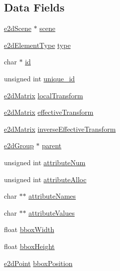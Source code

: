 \subsection*{Data Fields}
\begin{DoxyCompactItemize}
\item 
\hyperlink{structe2d_scene}{e2d\-Scene} $\ast$ \hyperlink{structe2d_element_a0ebd8fae058dd45496c86a2ca317ca9c}{scene}
\item 
\hyperlink{group__e2d_element_ga9bc8cfdec08c7e9069fc707ee456fd38}{e2d\-Element\-Type} \hyperlink{structe2d_element_a7df43d7f6c23b61b843acb56eb3ca19a}{type}
\item 
char $\ast$ \hyperlink{structe2d_element_aecb3b0d045ada529257a2fbf8f829599}{id}
\item 
unsigned int \hyperlink{structe2d_element_a300bb6cf5b184e200523e9bce8346dc4}{unique\-\_\-id}
\item 
\hyperlink{structe2d_matrix}{e2d\-Matrix} \hyperlink{structe2d_element_a52bda732df714953f93c1e6f5f7c7c93}{local\-Transform}
\item 
\hyperlink{structe2d_matrix}{e2d\-Matrix} \hyperlink{structe2d_element_a6c8e26945f09b5157e2111e42f99b879}{effective\-Transform}
\item 
\hyperlink{structe2d_matrix}{e2d\-Matrix} \hyperlink{structe2d_element_a5e6d7341f2dbef1923b0a3fcc13781c6}{inverse\-Effective\-Transform}
\item 
\hyperlink{structe2d_group}{e2d\-Group} $\ast$ \hyperlink{structe2d_element_a3e62eb2fbf1d6bc6d6fe549096a6cee9}{parent}
\item 
unsigned int \hyperlink{structe2d_element_a836181401227a3ca42da026a8d35e730}{attribute\-Num}
\item 
unsigned int \hyperlink{structe2d_element_a70d94929e3789bf7c019c939b0084985}{attribute\-Alloc}
\item 
char $\ast$$\ast$ \hyperlink{structe2d_element_af9b5d9dbbf270b6f92a3ee66ce1b47ac}{attribute\-Names}
\item 
char $\ast$$\ast$ \hyperlink{structe2d_element_ae8591ff93c366b4d66817a70f2d9f33e}{attribute\-Values}
\item 
float \hyperlink{structe2d_element_a6a1d9b223870deeaec7f5e8b23ca4b22}{bbox\-Width}
\item 
float \hyperlink{structe2d_element_a680d0d4219ac8720005c46b55a9676ae}{bbox\-Height}
\item 
\hyperlink{structe2d_point}{e2d\-Point} \hyperlink{structe2d_element_ac2c17ce4cba805b594b314a77923cbf5}{bbox\-Position}
\end{DoxyCompactItemize}


